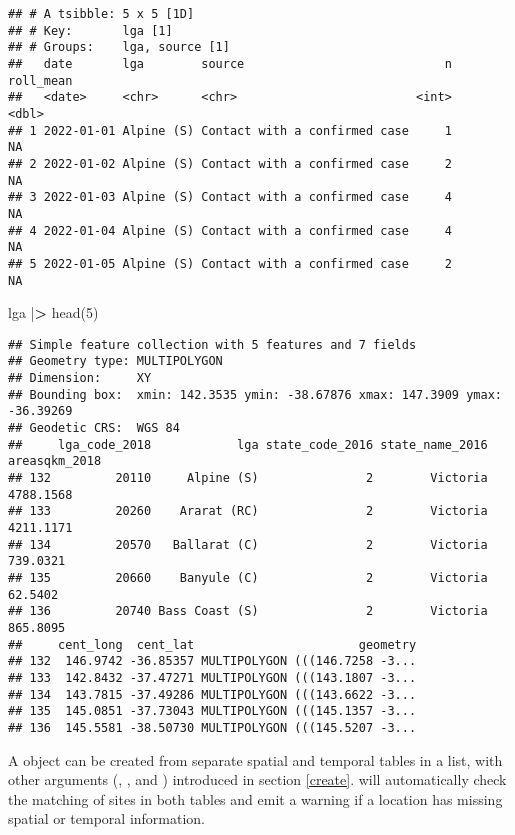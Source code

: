\documentclass{article}
\newenvironment{Shaded}{\begin{snugshade}}{\end{snugshade}}
\newcommand{\DecValTok}[1]{\textcolor[rgb]{0.00,0.00,0.81}{#1}}
\newcommand{\ErrorTok}[1]{\textcolor[rgb]{0.64,0.00,0.00}{\textbf{#1}}}
\newcommand{\FunctionTok}[1]{\textcolor[rgb]{0.00,0.00,0.00}{#1}}
\newcommand{\NormalTok}[1]{#1}
\newcommand{\SpecialCharTok}[1]{\textcolor[rgb]{0.00,0.00,0.00}{#1}}
\begin{document}
\begin{verbatim}
## # A tsibble: 5 x 5 [1D]
## # Key:       lga [1]
## # Groups:    lga, source [1]
##   date       lga        source                            n roll_mean
##   <date>     <chr>      <chr>                         <int>     <dbl>
## 1 2022-01-01 Alpine (S) Contact with a confirmed case     1        NA
## 2 2022-01-02 Alpine (S) Contact with a confirmed case     2        NA
## 3 2022-01-03 Alpine (S) Contact with a confirmed case     4        NA
## 4 2022-01-04 Alpine (S) Contact with a confirmed case     4        NA
## 5 2022-01-05 Alpine (S) Contact with a confirmed case     2        NA
\end{verbatim}

\begin{Shaded}
\begin{Highlighting}[]
\NormalTok{lga }\SpecialCharTok{|}\ErrorTok{\textgreater{}} \FunctionTok{head}\NormalTok{(}\DecValTok{5}\NormalTok{)}
\end{Highlighting}
\end{Shaded}

\begin{verbatim}
## Simple feature collection with 5 features and 7 fields
## Geometry type: MULTIPOLYGON
## Dimension:     XY
## Bounding box:  xmin: 142.3535 ymin: -38.67876 xmax: 147.3909 ymax: -36.39269
## Geodetic CRS:  WGS 84
##     lga_code_2018            lga state_code_2016 state_name_2016 areasqkm_2018
## 132         20110     Alpine (S)               2        Victoria     4788.1568
## 133         20260    Ararat (RC)               2        Victoria     4211.1171
## 134         20570   Ballarat (C)               2        Victoria      739.0321
## 135         20660    Banyule (C)               2        Victoria       62.5402
## 136         20740 Bass Coast (S)               2        Victoria      865.8095
##     cent_long  cent_lat                       geometry
## 132  146.9742 -36.85357 MULTIPOLYGON (((146.7258 -3...
## 133  142.8432 -37.47271 MULTIPOLYGON (((143.1807 -3...
## 134  143.7815 -37.49286 MULTIPOLYGON (((143.6622 -3...
## 135  145.0851 -37.73043 MULTIPOLYGON (((145.1357 -3...
## 136  145.5581 -38.50730 MULTIPOLYGON (((145.5207 -3...
\end{verbatim}

A  object can be created from separate spatial and temporal tables in a list, with other arguments (, , and ) introduced in section \ref{create}.  will automatically check the matching of sites in both tables and emit a warning if a location has missing spatial or temporal information.
\end{document}
